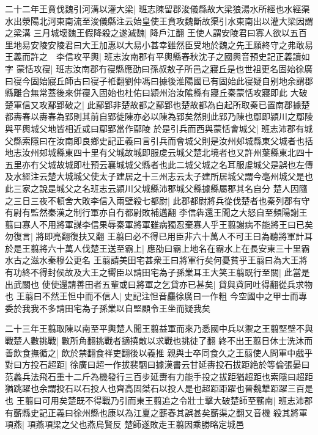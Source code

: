 二十二年王賁伐魏引河溝以灌大梁|{
	班志陳留郡浚儀縣故大梁狼湯水所經也水經渠水出滎陽北河東南流至浚儀縣注云始皇使王賁攻魏斷故渠引水東南出以灌大梁因謂之梁溝}
三月城壞魏王假降殺之遂滅魏|{
	降戶江翻}
王使人謂安陵君曰寡人欲以五百里地易安陵安陵君曰大王加惠以大易小甚幸雖然臣受地於魏之先王願終守之弗敢易王義而許之　李信攻平輿|{
	班志汝南郡有平輿縣春秋沈子之國輿音預史記正義讀如字}
蒙恬攻寑|{
	班志汝南郡冇寑縣應劭曰孫叔敖子所邑之寢丘是也世祖更名固始徐廣曰寑今固始寢丘師古曰寑子袵翻劉仲馮曰據後淮陽國已有固始此寑疑自别地余謂郡縣離合無常蓋後來併寑入固始也杜佑曰潁州治汝隂縣有寢丘秦蒙恬攻寢即此}
大破楚軍信又攻鄢郢破之|{
	此鄢郢非楚故都之鄢郢也楚故都為白起所取秦已置南郡據楚都夀春以夀春為郢則其前自郢徙陳亦必以陳為郢矣然則此郢乃陳也鄢即潁川之鄢陵與平輿城父地皆相近或曰鄢郢當作鄢陵}
於是引兵而西與蒙恬會城父|{
	班志沛郡有城父縣索隱曰在汝南即良鄉史記正義曰言引兵而會城父則是汝州郟城縣東父城者也括地志汝州郟城縣東四十里有父城故城即服䖍云城父楚北境者也又許州葉縣東北四十五里亦冇父城故城即杜預云襄城城父縣者也此二城父城之名耳服䖍城父是誤也左傳及水經注云楚大城城父使太子建居之十三州志云太子建所居城父謂今亳州城父是也此三家之說是城父之名班志云潁川父城縣沛郡城父縣據縣屬郡其名自分}
楚人因隨之三日三夜不頓舍大敗李信入兩壁殺七都尉|{
	此郡都尉將兵從伐楚者也秦列郡有守有尉有監然秦漢之制行軍亦自冇都尉敗補邁翻}
李信犇還王聞之大怒自至頻陽謝王翦曰寡人不用將軍謀李信果辱秦軍將軍雖病獨忍棄寡人乎王翦謝病不能將王曰已矣勿復言|{
	將即亮翻復扶又翻}
王翦曰必不得已用臣非六十萬人不可王曰為聽將軍計耳於是王翦將六十萬人伐楚王送至霸上|{
	應劭曰霸上地名在霸水上在長安東三十里霸水古之滋水秦穆公更名}
王翦請美田宅甚衆王曰將軍行矣何憂貧乎王翦曰為大王將有功終不得封侯故及大王之嚮臣以請田宅為子孫業耳王大笑王翦既行至關|{
	此當是出武關也}
使使還請善田者五輩或曰將軍之乞貸亦已甚矣|{
	貸與貣同吐得翻從兵求物也}
王翦曰不然王怛中而不信人|{
	史記注怛音麤徐廣曰一作粗}
今空國中之甲士而專委於我我不多請田宅為子孫業以自堅顧令王坐而疑我矣

二十三年王翦取陳以南至平輿楚人聞王翦益軍而來乃悉國中兵以禦之王翦堅壁不與戰楚人數挑戰|{
	數所角翻挑戰者擿撓敵以求戰也挑徒了翻}
終不出王翦日休士洗沐而善飲食撫循之|{
	飲於禁翻食祥吏翻後以義推}
親與士卒同食久之王翦使人問軍中戲乎對曰方投石超距|{
	徐廣曰超一作拔裴駰曰據漢書云甘延夀投石拔距絶於等倫張晏曰范蠡兵法飛石重十二斤為機發行三百步延夀有力能手投之拔距猶超距也索隱曰超距猶跳躍也余謂投石以石投人也齊高固桀石以投人是也超距距躍也晉魏犨距躍三百是也}
王翦曰可用矣楚既不得戰乃引而東王翦追之令壯士擊大破楚師至蘄南|{
	班志沛郡有蘄縣史記正義曰徐州縣也康以為江夏之蘄春其誤甚矣蘄渠之翻又音機}
殺其將軍項燕|{
	項燕項梁之父也燕烏賢反}
楚師遂敗走王翦因乘勝略定城邑


